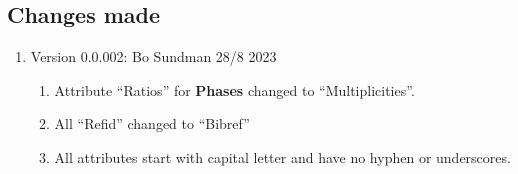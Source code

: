 \documentclass{article}
\begin{document}
\begin{appendices}
\newpage
\section{Changes made}\label{sec:changes}

\begin{enumerate}
\item  Version 0.0.002: Bo Sundman 28/8 2023
\begin{enumerate}

\item Attribute ``Ratios'' for {\bf Phases} changed to ``Multiplicities''.

\item All ``Refid'' changed to ``Bibref''

\item All attributes start with capital letter and have no hyphen or
  underscores.
  
\end{enumerate}
\end{enumerate}

\end{appendices}
\end{document}
